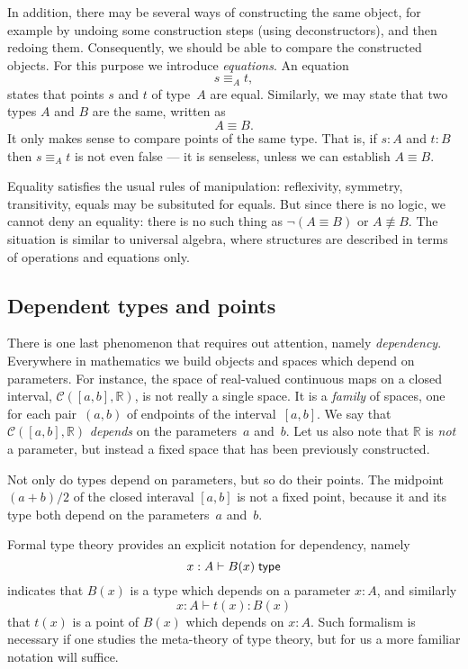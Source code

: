 \documentclass{amsart}
\begin{document}
In addition, there may be several ways of constructing the same object, for
example by undoing some construction steps (using deconstructors), and then
redoing them. Consequently, we should be able to compare the constructed
objects. For this purpose we introduce \emph{equations}. An equation
%
\begin{equation*}
  s \equiv_A t,
\end{equation*}
%
states that points $s$ and $t$ of type~$A$ are equal.
%
Similarly, we may state that two types $A$ and $B$ are the same, written as
%
\begin{equation*}
  A \equiv B.
\end{equation*}
%
It only makes sense to compare points of the same type. That is, if $s : A$ and
$t : B$ then $s \equiv_A t$ is not even false --- it is senseless, unless we can
establish $A \equiv B$.

Equality satisfies the usual rules of manipulation: reflexivity, symmetry,
transitivity, equals may be subsituted for equals. But since there is no logic,
we cannot deny an equality: there is no such thing as $\lnot (A \equiv B)$ or
$A \not\equiv B$. The situation is similar to universal algebra, where
structures are described in terms of operations and equations only.

\subsection{Dependent types and points}
\label{sec:depend-types-points}

There is one last phenomenon that requires out attention, namely
\emph{dependency}. Everywhere in mathematics we build objects and spaces which
depend on parameters. For instance, the space of real-valued continuous maps on
a closed interval, $\mathcal{C}([a,b], \mathbb{R})$, is not really a single
space. It is a \emph{family} of spaces, one for each pair~$(a,b)$ of endpoints
of the interval~$[a,b]$. We say that $\mathcal{C}([a,b], \mathbb{R})$
\emph{depends} on the parameters~$a$ and~$b$. Let us also note that $\mathbb{R}$
is \emph{not} a parameter, but instead a fixed space that has been previously
constructed.

Not only do types depend on parameters, but so do their points. The midpoint
$(a+b)/2$ of the closed interaval $[a,b]$ is not a fixed point, because it and
its type both depend on the parameters~$a$ and~$b$.

Formal type theory provides an explicit notation for dependency, namely
%
\begin{equation*}
  x : A \vdash B(x)\; \mathsf{type}
\end{equation*}
%
indicates that $B(x)$ is a type which depends on a parameter $x : A$, and similarly
%
\begin{equation*}
  x : A \vdash t(x) : B(x)
\end{equation*}
%
that $t(x)$ is a point of $B(x)$ which depends on $x : A$. Such formalism is
necessary if one studies the meta-theory of type theory, but for us a more
familiar notation will suffice.
\end{document}
